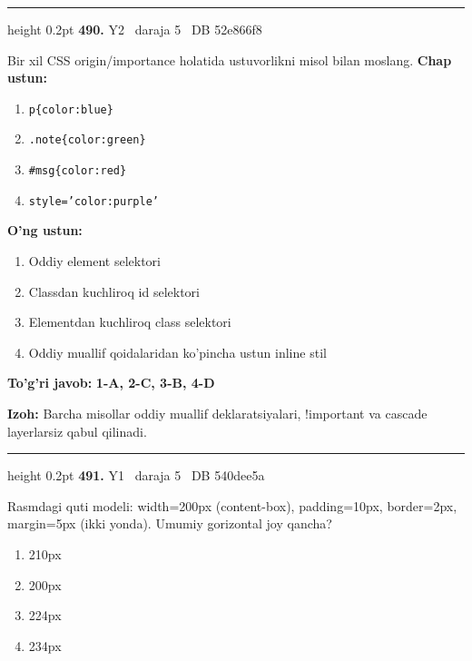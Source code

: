 \documentclass[10pt,a4paper,oneside]{article}
\begin{document}
\vspace{2mm}\hrule height 0.2pt \vspace{4mm}
\hypertarget{q490}{\textbf{\color{ink}490.}}  {\color{muted}\scriptsize Y2 \textbullet\ daraja 5 \textbullet\ DB 52e866f8}
\par
Bir xil CSS origin/importance holatida ustuvorlikni misol bilan moslang.
\textbf{\footnotesize Chap ustun:}
\begin{enumerate}[label=\arabic*),leftmargin=9mm]
\item \texttt{p\{color:blue\}}
\item \texttt{.note\{color:green\}}
\item \texttt{\#msg\{color:red\}}
\item \texttt{style='color:purple'}
\end{enumerate}
\textbf{\footnotesize O'ng ustun:}
\begin{enumerate}[label=\Alph*),leftmargin=9mm]
\item Oddiy element selektori
\item Classdan kuchliroq id selektori
\item Elementdan kuchliroq class selektori
\item Oddiy muallif qoidalaridan ko'pincha ustun inline stil
\end{enumerate}
\begin{tcolorbox}[enhanced,breakable,colback=teal!4,colframe=teal!45!black,boxrule=0.45pt,arc=1.2mm,left=2.8mm,right=2.8mm,top=2mm,bottom=2mm,before skip=2mm,after skip=2mm]
\textbf{\color{teal}To'g'ri javob:} \textbf{1-A, 2-C, 3-B, 4-D}
\par\smallskip
\textbf{Izoh:} Barcha misollar oddiy muallif deklaratsiyalari, !important va cascade layerlarsiz qabul qilinadi.
\end{tcolorbox}
\vspace{2mm}\hrule height 0.2pt \vspace{4mm}
\hypertarget{q491}{\textbf{\color{ink}491.}}  {\color{muted}\scriptsize Y1 \textbullet\ daraja 5 \textbullet\ DB 540dee5a}
\par
Rasmdagi quti modeli: width=200px (content-box), padding=10px, border=2px, margin=5px (ikki yonda). Umumiy gorizontal joy qancha?
\begin{enumerate}[label=\Alph*),leftmargin=9mm]
\item 210px
\item 200px
\item 224px
\item 234px
\end{enumerate}
\end{document}
